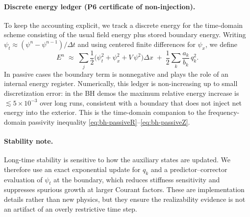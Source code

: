 \paragraph{Discrete energy ledger (P6 certificate of non-injection).}
To keep the accounting explicit, we track a discrete energy for the time-domain scheme consisting of the usual field energy plus stored boundary energy. Writing $\psi_t\approx(\psi^n-\psi^{n-1})/\Delta t$ and using centered finite differences for $\psi_x$, we define
\begin{equation}
  E^n \;\approx\; \sum_j \frac{1}{2}\Big(\psi_t^2 + \psi_x^2 + V\,\psi^2\Big)\Delta x
  \; + \; \frac{1}{2}\sum_k \frac{a_k}{b_k}\,q_k^2.
  \label{eq:bh-discrete-energy}
\end{equation}
In passive cases the boundary term is nonnegative and plays the role of an internal energy register. Numerically, this ledger is non-increasing up to small discretization error: in the BH demos the maximum relative energy increase is $\lesssim 5\times 10^{-3}$ over long runs, consistent with a boundary that does not inject net energy into the exterior. This is the time-domain companion to the frequency-domain passivity inequality \eqref{eq:bh-passiveR}--\eqref{eq:bh-passiveZ}.

\paragraph{Stability note.}
Long-time stability is sensitive to how the auxiliary states are updated. We therefore use an exact exponential update for $q_k$ and a predictor--corrector evaluation of $\psi_t$ at the boundary, which reduces stiffness sensitivity and suppresses spurious growth at larger Courant factors. These are implementation details rather than new physics, but they ensure the realizability evidence is not an artifact of an overly restrictive time step.
